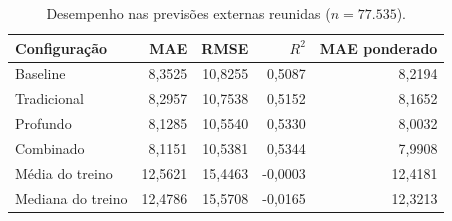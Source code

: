 \begin{table}[htbp]
\centering\small
\caption{Desempenho nas previsões externas reunidas ($n=77.535$).}
\label{tab:metricas}
\begin{tabular}{lrrrr}
\toprule
Configuração & MAE & RMSE & $R^2$ & MAE ponderado \\
\midrule
Baseline & 8,3525 & 10,8255 & 0,5087 & 8,2194 \\
Tradicional & 8,2957 & 10,7538 & 0,5152 & 8,1652 \\
Profundo & 8,1285 & 10,5540 & 0,5330 & 8,0032 \\
Combinado & 8,1151 & 10,5381 & 0,5344 & 7,9908 \\
Média do treino & 12,5621 & 15,4463 & -0,0003 & 12,4181 \\
Mediana do treino & 12,4786 & 15,5708 & -0,0165 & 12,3213 \\
\bottomrule
\end{tabular}
\end{table}
